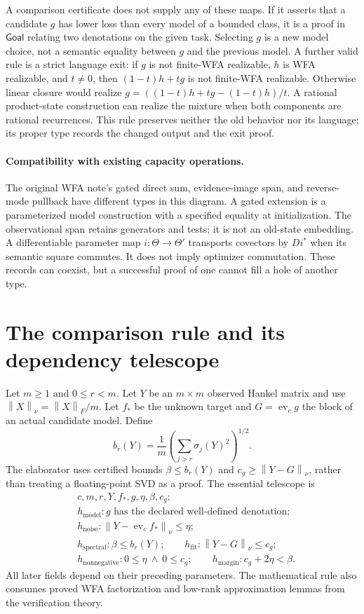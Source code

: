 \documentclass[11pt]{article}
\newcommand{\Cat}[1]{\mathsf{#1}}
\newcommand{\norm}[1]{\left\lVert #1\right\rVert}
\newcommand{\ev}{\operatorname{ev}}
\begin{document}
A comparison certificate does not supply any of these maps. If it asserts
that a candidate $g$ has lower loss than every model of a bounded class,
it is a proof in $\Cat{Goal}$ relating two denotations on the given task.
Selecting $g$ is a new model choice, not a semantic equality between $g$
and the previous model. A further valid rule is a strict language exit:
if $g$ is not finite-WFA realizable, $h$ is WFA realizable, and $t\ne0$,
then $(1-t)h+tg$ is not finite-WFA realizable. Otherwise linear closure
would realize $g=((1-t)h+tg-(1-t)h)/t$. A rational product-state
construction can realize the mixture when both components are rational
recurrences. This rule preserves neither the old behavior nor its
language; its proper type records the changed output and the exit proof.

\paragraph{Compatibility with existing capacity operations.}
The original WFA note's gated direct sum, evidence-image span, and
reverse-mode pullback have different types in this diagram. A gated
extension is a parameterized model construction with a specified equality
at initialization. The observational span retains generators and tests;
it is not an old-state embedding. A differentiable parameter map
$i:\Theta\to\Theta'$ transports covectors by $Di^*$ when its semantic
square commutes. It does not imply optimizer commutation. These records
can coexist, but a successful proof of one cannot fill a hole of another
type.

\section{The comparison rule and its dependency telescope}

Let $m\geq1$ and $0\leq r<m$. Let $Y$ be an $m\times m$ observed Hankel matrix and use
$\norm{X}_\nu=\norm{X}_F/m$. Let $f_*$ be the unknown target and
$G=\ev_c g$ the block of an actual candidate model. Define
\[
 b_r(Y)=\frac1m\left(\sum_{j>r}\sigma_j(Y)^2\right)^{1/2}.
\]
The elaborator uses certified bounds $\beta\leq b_r(Y)$ and
$c_g\geq\norm{Y-G}_\nu$, rather than treating a floating-point SVD
as a proof. The essential telescope is
\begin{align*}
 &c,m,r,Y,f_*,g,\eta,\beta,c_g;\\
 &h_{\mathrm{model}}:g\text{ has the declared well-defined denotation};\\
 &h_{\mathrm{noise}}:\norm{Y-\ev_c f_*}_\nu\leq\eta;\\
 &h_{\mathrm{spectral}}:\beta\leq b_r(Y);\qquad
 h_{\mathrm{fit}}:\norm{Y-G}_\nu\leq c_g;\\
 &h_{\mathrm{nonnegative}}:0\leq\eta\ \wedge\ 0\leq c_g;\qquad
 h_{\mathrm{margin}}:c_g+2\eta<\beta .
\end{align*}
All later fields depend on their preceding parameters. The mathematical
rule also consumes proved WFA factorization and low-rank approximation
lemmas from the verification theory.
\end{document}
